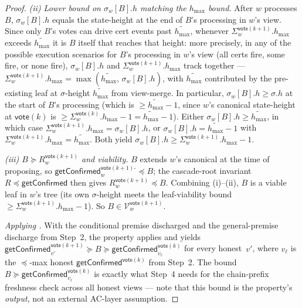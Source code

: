\ifx\litemode\undefined\documentclass{article}\fi
\newcommand{\V}[0]{\ensuremath{\mathcal{V}}}
\newcommand{\hmax}{\ensuremath{h_{\max}}\xspace}
\newcommand{\vote}{\ensuremath{\mathsf{vote}}}
\newcommand{\comm}[1]{\ensuremath{\widetilde{#1}}}
\newcommand{\getConfirmed}{\textsf{getConfirmed}\xspace}
\theoremstyle{plain}
\theoremstyle{definition}
\theoremstyle{remark}
\begin{document}
\begin{proof}
\emph{(ii) Lower bound on $\sigma_w[B].h$ matching the $\hmax$ bound.}
After $w$ processes $B$, $\sigma_w[B].h$ equals the state-height at the end of $B$'s processing in $w$'s view. Since only $B$'s votes can drive cert events past $\comm{\hmax}$, whenever $\Sigma_w^{\vote(k+1)}.\hmax$ exceeds $\comm{\hmax}$ it is $B$ itself that reaches that height: more precisely, in any of the possible execution scenarios for $B$'s processing in $w$'s view (all certs fire, some fire, or none fire), $\sigma_w[B].h$ and $\Sigma_w^{\vote(k+1)}.\hmax$ track together — $\Sigma_w^{\vote(k+1)}.\hmax = \max(\comm{\hmax},\, \sigma_w[B].h)$, with $\comm{\hmax}$ contributed by the pre-existing leaf at $\sigma$-height $\comm{\hmax}$ from view-merge. In particular, $\sigma_w[B].h \geq \sigma.h$ at the start of $B$'s processing (which is $\geq \comm{\hmax}-1$, since $w$'s canonical state-height at $\vote(k)$ is $\geq \Sigma_w^{\vote(k)}.\hmax - 1 = \comm{\hmax}-1$). Either $\sigma_w[B].h \geq \comm{\hmax}$, in which case $\Sigma_w^{\vote(k+1)}.\hmax = \sigma_w[B].h$, or $\sigma_w[B].h = \comm{\hmax}-1$ with $\Sigma_w^{\vote(k+1)}.\hmax = \comm{\hmax}$. Both yield $\sigma_w[B].h \geq \Sigma_w^{\vote(k+1)}.\hmax - 1$.

\emph{(iii) $B \succeq R_w^{\vote(k+1)}$ and viability.}
$B$ extends $w$'s canonical at the time of proposing, so $\getConfirmed_w^{\vote(k+1)\text{-}} \preceq B$; the cascade-root invariant $R \preceq \getConfirmed$ then gives $R_w^{\vote(k+1)} \preceq B$. Combining (i)--(ii), $B$ is a viable leaf in $w$'s tree (its own $\sigma$-height meets the leaf-viability bound $\geq \Sigma_w^{\vote(k+1)}.\hmax - 1$). So $B \in \V_w^{\vote(k+1)}$.

\emph{Applying .}
With the conditional premise discharged and the general-premise discharge from Step~2, the property applies and yields $\getConfirmed_{v'}^{\vote(k+1)} \succeq B \succeq \getConfirmed_{v_\ell}^{\vote(k)}$ for every honest~$v'$, where $v_\ell$ is the $\preceq$-max honest $\getConfirmed^{\vote(k)}$ from Step~2. The bound $B \succeq \getConfirmed_{v_\ell}^{\vote(k)}$ is exactly what Step~4 needs for the chain-prefix freshness check across all honest views — note that this bound is the property's \emph{output}, not an external AC-layer assumption.


\end{proof}
\end{document}
